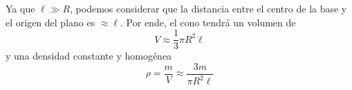 \documentclass[]{article}
\numberwithin{equation}{section}
\newcommand{\0}{\textcolor{gray}{0}}
\newcommand{\rv}{\mathbf{r}}
\newcommand{\rhat}{\hat{\rv}}
\begin{document}
Ya que \(\ell \gg R\), podemos considerar que la distancia entre el centro de la base y el origen del plano es \(\approx \ell\). Por ende, el cono tendrá un volumen de
\begin{equation}
	V \approx \frac{1}{3}\pi R^2 \ell
\end{equation}
y una densidad constante y homogénea
\begin{equation}
	\rho = \frac{m}{V} \approx \frac{3 m}{\pi R^2 \ell}
\end{equation}
%
\end{document}
